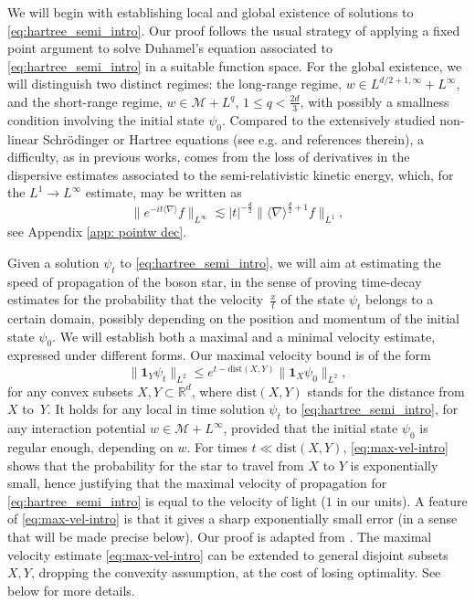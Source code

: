 \documentclass[12pt]{article}
\theoremstyle{plain}
\newcommand{\meas}{\mathcal{M}}
\begin{document}
We will begin with establishing local and global existence of solutions to \eqref{eq:hartree_semi_intro}. Our proof follows the usual strategy of applying a fixed point argument to solve Duhamel's equation associated to \eqref{eq:hartree_semi_intro} in a suitable function space. For the global existence, we will distinguish two distinct regimes: the long-range regime, $w\in L^{d/2+1,\infty}+L^\infty$, and the short-range regime, $w\in\meas +L^q$, $1\le q<\frac{2d}{3}$, with possibly a smallness condition involving the initial state $\psi_0$. Compared to the extensively studied non-linear Schrödinger or Hartree equations (see e.g.  \cites{cazenaveWeissler_H1,cazenaveWeissler_Hs,Tao,GinibreVelo} and references therein), a difficulty, as in previous works, comes from the loss of derivatives in the dispersive estimates associated to the semi-relativistic kinetic energy, which, for the $L^1\to L^\infty$ estimate, may be written as
\begin{equation}\label{eq:dispersive_est_intro}
    \big\|e^{-it\langle\nabla\rangle}f\big\|_{L^\infty}\lesssim |t|^{-\frac{d}{2}}\|\langle\nabla\rangle^{\frac{d}{2}+1} f\|_{L^1}, %
\end{equation}
see Appendix \ref{app: pointw dec}.

Given a solution $\psi_t$ to \eqref{eq:hartree_semi_intro}, we will aim at estimating the speed of propagation of the boson star, in the sense of proving time-decay estimates for the probability that the velocity~$\frac{x}{t}$ of the state $\psi_t$ belongs to a certain domain, possibly depending on the position and momentum of the initial state $\psi_0$. We will establish both a maximal and a minimal velocity estimate, expressed under different forms. Our maximal velocity bound is of the form
\begin{equation}\label{eq:max-vel-intro}
    \|\mathbf{1}_Y\psi_t\|_{L^2}\le e^{t-\mathrm{dist}(X,Y)}\|\mathbf{1}_X\psi_0\|_{L^2},
\end{equation}
for any convex subsets $X,Y\subset\mathbb{R}^d$, where $\mathrm{dist}(X,Y)$ stands for the distance from $X$ to~$Y$. It holds for any local in time solution $\psi_t$ to \eqref{eq:hartree_semi_intro}, for any interaction potential $w\in\meas +L^\infty$, provided that the initial state $\psi_0$ is regular enough, depending on $w$. For times $t\ll \mathrm{dist}(X,Y)$, \eqref{eq:max-vel-intro} shows that the probability for the star to travel from $X$ to $Y$ is exponentially small, hence justifying that the maximal velocity of propagation for \eqref{eq:hartree_semi_intro} is equal to the velocity of light ($1$ in our units). A feature of \eqref{eq:max-vel-intro} is that it gives a sharp exponentially small error  (in a sense that will be made precise below). Our proof is adapted from \cite{SigalWu}. The maximal velocity estimate \eqref{eq:max-vel-intro} can be extended to general disjoint subsets $X,Y$, dropping the convexity assumption, at the cost of losing optimality. See below for more details. 
\end{document}
